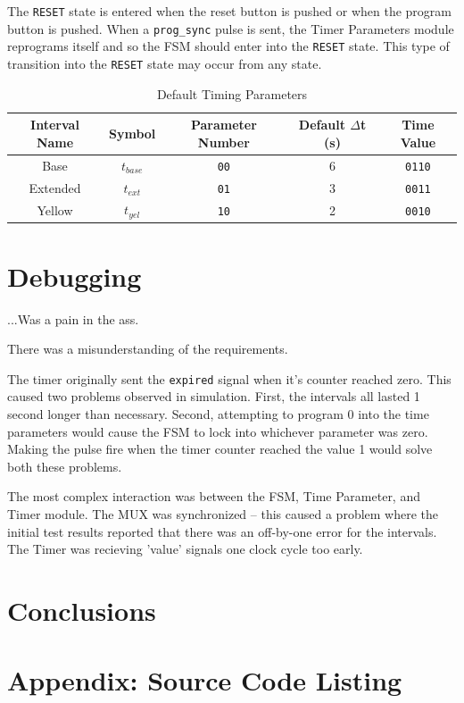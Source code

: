 \documentclass{article}
\begin{document}
		The \texttt{RESET} state is entered when the reset button is pushed or
		when the program button is pushed.
		When a \texttt{prog\_sync} pulse is sent, the Timer Parameters module
		reprograms itself and so the FSM should enter into the \texttt{RESET}
		state.  This type of transition into the \texttt{RESET} state may occur
		from any state.
	
	\begin{table}
	\centering
		\begin{tabular}{|c|c|c|c|c|}
		\hline
		Interval Name & Symbol & Parameter Number & Default $\Delta$t (s) & Time Value \\ \hline
		Base & $t_{base}$ & \texttt{00} & 6 & \texttt{0110} \\ \hline
		Extended & $t_{ext}$ & \texttt{01} & 3 & \texttt{0011} \\ \hline
		Yellow & $t_{yel}$ & \texttt{10} & 2 & \texttt{0010} \\ \hline
		\end{tabular}
	\caption{Default Timing Parameters}
	\label{tbl:timeparam}
	\end{table}


\section{Debugging}
	...Was a pain in the ass.

	There was a misunderstanding of the requirements.

	The timer originally sent the \texttt{expired} signal when it's counter
	reached zero.  This caused two problems observed in simulation.  First,
	the intervals all lasted 1 second longer than necessary.  Second, attempting
	to program 0 into the time parameters would cause the FSM to lock into whichever
	parameter was zero.  Making the pulse fire when the timer counter reached
	the value 1 would solve both these problems.

	The most complex interaction was between the FSM, Time Parameter, and
	Timer module.  The MUX was synchronized -- this caused a problem where
	the initial test results reported that there was an off-by-one error
	for the intervals.  The Timer was recieving 'value' signals one clock
	cycle too early.

\section{Conclusions}

\newpage
\section{Appendix: Source Code Listing}
\end{document}
